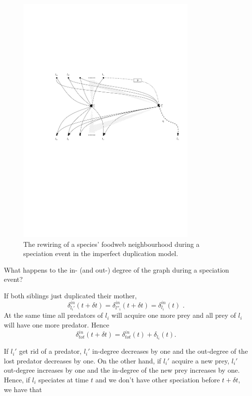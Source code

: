\documentclass[12pt,a4paper]{report}
\begin{document}
\begin{figure}[h]
	\centering
		\includegraphics[width=0.8\textwidth]{images/fwspec1p}
		\caption{The rewiring of a species' foodweb neighbourhood during a speciation event in the imperfect duplication model.}
		\label{fig:fwspec1p}
\end{figure}

What happens to the in- (and out-) degree of the graph during a speciation event?

If both siblings just duplicated their mother, $$\delta^{in}_{l_i'}(t+\delta t)=\delta^{in}_{l''_i}(t+\delta t)=\delta^{in}_{l_i}(t) \, \, .$$ At the same time all predators of $l_i$ will acquire one more prey and all prey of $l_i$ will have one more predator.
Hence $$\delta^{in}_{tot}(t + \delta t) = \delta^{in}_{tot}(t) + \delta_{l_i}(t).$$

If $l_i'$ get rid of a predator, $l_i'$ in-degree decreases by one and the out-degree of the lost predator decreases by one. On the other hand, if $l_i'$ acquire a new prey, $l_i'$ out-degree increases by one and the in-degree of the new prey increases by one. Hence, if $l_i$ speciates at time $t$ and we don't have other speciation before $t + \delta t$, we have that
\end{document}
